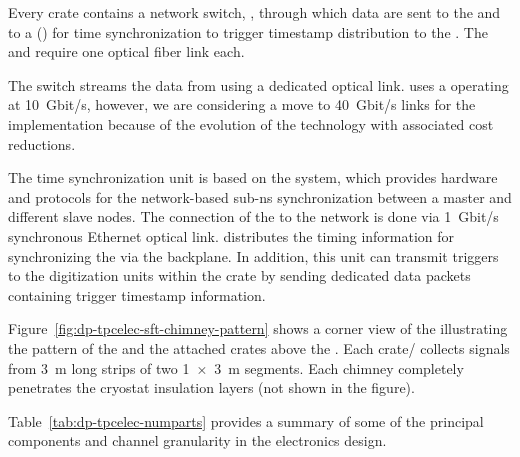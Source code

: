 Every  crate contains a network switch, , through which data are sent to the   and to a () for time synchronization to trigger timestamp distribution to the . %
The  and  require one optical fiber link each. 

The  switch streams the data from  using a dedicated optical link.  uses a  operating at \SI{10}{Gbit/s}, however, we are considering a move to \SI{40}{Gbit/s} links for the  implementation because of the evolution of the technology with associated cost reductions.

The  time synchronization unit is based on the  system, which provides hardware and protocols for the network-based sub-\si{\nano\s} synchronization between a master and different slave nodes. The connection of the  to the  network is done via \SI{1}{Gbit/s} synchronous Ethernet optical link.  distributes the timing information for synchronizing the  via the  backplane. In addition, this unit can transmit triggers to the digitization units within the crate by sending dedicated data packets containing trigger timestamp information. 

Figure~\ref{fig:dp-tpcelec-sft-chimney-pattern} shows a corner view of the  illustrating the pattern of the  and the attached  crates above the . Each crate/ collects signals from \SI{3}{\meter} long strips of two \SI[product-units=power]{1x3}{\meter}  segments. Each chimney completely %
penetrates the cryostat insulation layers (not shown in the figure). 

Table~\ref{tab:dp-tpcelec-numparts} provides a summary of some of the principal components and channel granularity in the \dual electronics design. 

